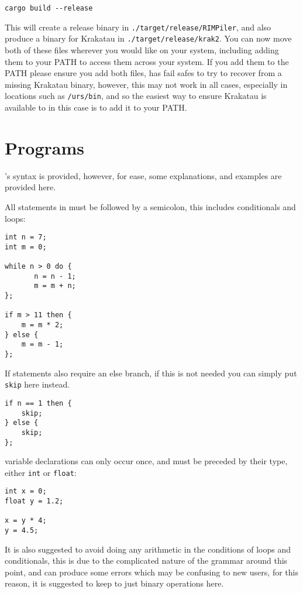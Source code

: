 \begin{lstlisting}
cargo build --release
\end{lstlisting}

This will create a release binary in \lstinline{./target/release/RIMPiler}, and also produce a binary for Krakatau in \lstinline{./target/release/krak2}. You can now move both of these files wherever you would like on your system, including adding them to your PATH to access them across your system. 
If you add them to the PATH please ensure you add both files, \rimp has fail safes to try to recover from a missing Krakatau binary, however, this may not work in all cases, especially in locations such as \lstinline{/urs/bin}, and so the easiest way to ensure Krakatau is available to \rimp in this case is to add it to your PATH.

\section{\rimplang Programs}

\rimplang's syntax is provided, however, for ease, some explanations, and examples are provided here. 

All statements in \rimp must be followed by a semicolon, this includes conditionals and loops:

\begin{lstlisting}
int n = 7;
int m = 0;

while n > 0 do {
       n = n - 1;
       m = m + n;
};

if m > 11 then {
    m = m * 2;
} else {
    m = m - 1;
};
\end{lstlisting}

If statements also require an else branch, if this is not needed you can simply put \lstinline{skip} here instead.

\begin{lstlisting}
if n == 1 then {
    skip;
} else {
    skip;
};
\end{lstlisting}

variable declarations can only occur once, and must be preceded by their type, either \lstinline{int} or \lstinline{float}:
\newpage
\begin{lstlisting}
int x = 0;
float y = 1.2;

x = y * 4;
y = 4.5;
\end{lstlisting}

It is also suggested to avoid doing any arithmetic in the conditions of loops and conditionals, this is due to the complicated nature of the grammar around this point, and can produce some errors which may be confusing to new users, for this reason, it is suggested to keep to just binary operations here.

